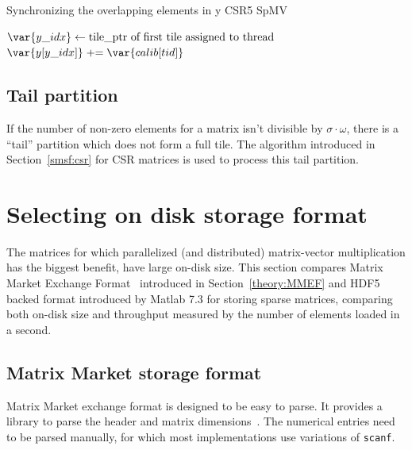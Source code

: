 \documentclass[thesis=M,english]{FITthesis}[2019/12/23]
\newcommand{\pluseq}{\mathrel{+}=}
\begin{document}
\begin{algorithm}[htp]
    \caption{Synchronizing the overlapping elements in y CSR5 SpMV}\label{csr5:calib}
    \begin{algorithmic}

        \State $\var{y\_idx} \gets \text{tile\_ptr of first tile assigned to thread}$
        \State $\var{y[y\_idx]} \pluseq \var{calib[tid]}$
        \EndFor
        \EndFunction
    \end{algorithmic}
\end{algorithm}

\subsection{Tail partition}

If the number of non-zero elements for a matrix isn't divisible by \(\sigma{} \cdot \omega{}\), there
is a ``tail'' partition which does not form a full tile. The algorithm introduced in Section~\ref{smsf:csr}
for CSR matrices is used to process this tail partition.


\section{Selecting on disk storage format}\label{impl:matlabComp}

The matrices for which parallelized (and distributed) matrix-vector multiplication has the biggest benefit,
have large on-disk size. This section compares Matrix Market Exchange Format~\cite{mmef} introduced in
Section~\ref{theory:MMEF} and HDF5 backed format
introduced by Matlab 7.3 for storing sparse matrices, comparing both on-disk size and throughput
measured by the number of elements loaded in a second.

\subsection{Matrix Market storage format}


Matrix Market exchange format is designed to be easy to parse. It provides a library to parse
the header and matrix dimensions~\cite{mmC}.
The numerical entries need to be parsed manually, for which most implementations use variations of \texttt{scanf}.
\end{document}
